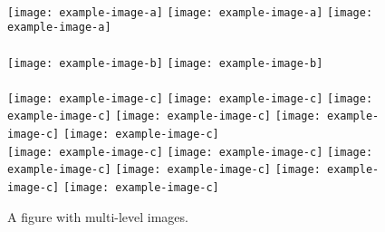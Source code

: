 \begin{figure*}[t] \centering
    \\
    \texttt{[image: example-image-a]}
    \texttt{[image: example-image-a]}
    \texttt{[image: example-image-a]}
    \\
     \hfill
    \\
    \texttt{[image: example-image-b]} \hfill
    \texttt{[image: example-image-b]}
    \\
    \\
    \texttt{[image: example-image-c]}
    \texttt{[image: example-image-c]}
    \texttt{[image: example-image-c]}
    \texttt{[image: example-image-c]}
    \texttt{[image: example-image-c]}
    \texttt{[image: example-image-c]}
    \\
    \texttt{[image: example-image-c]}
    \texttt{[image: example-image-c]}
    \texttt{[image: example-image-c]}
    \texttt{[image: example-image-c]}
    \texttt{[image: example-image-c]}
    \texttt{[image: example-image-c]}
    \\
    \caption{A figure with multi-level images.} 
    \label{fig:fig10}
\end{figure*}
